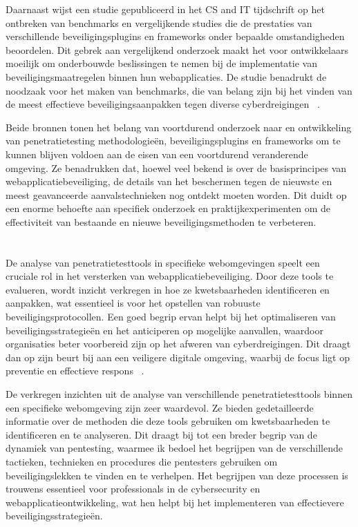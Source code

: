 Daarnaast wijst een studie gepubliceerd in het CS and IT tijdschrift op het ontbreken van benchmarks en vergelijkende studies die de prestaties van verschillende 
beveiligingsplugins en frameworks onder bepaalde omstandigheden beoordelen. Dit gebrek aan vergelijkend onderzoek maakt het voor ontwikkelaars 
moeilijk om onderbouwde beslissingen te nemen bij de implementatie van beveiligingsmaatregelen binnen hun webapplicaties. De studie benadrukt de noodzaak voor 
het maken van benchmarks, die van belang zijn bij het vinden van de meest effectieve beveiligingsaanpakken tegen diverse cyberdreigingen ~\autocite{AbuDabaseh2018}.

Beide bronnen tonen het belang van voortdurend onderzoek naar en ontwikkeling van penetratietesting methodologieën, beveiligingsplugins en frameworks om te kunnen 
blijven voldoen aan de eisen van een voortdurend veranderende omgeving. Ze benadrukken dat, hoewel veel bekend is over de basisprincipes van webapplicatiebeveiliging, 
de details van het beschermen tegen de nieuwste en meest geavanceerde aanvalstechnieken nog ontdekt moeten worden. Dit duidt op een enorme behoefte aan 
specifiek onderzoek en praktijkexperimenten om de effectiviteit van bestaande en nieuwe beveiligingsmethoden te verbeteren.

\section{}
\subsection{}
De analyse van penetratietesttools in specifieke webomgevingen speelt een cruciale rol in het versterken van webapplicatiebeveiliging. Door deze tools 
te evalueren, wordt inzicht verkregen in hoe ze kwetsbaarheden identificeren en aanpakken, wat essentieel is voor het opstellen van robuuste beveiligingsprotocollen. 
Een goed begrip ervan helpt bij het optimaliseren van beveiligingsstrategieën en het anticiperen op mogelijke aanvallen, waardoor organisaties beter voorbereid zijn op het 
afweren van cyberdreigingen. Dit draagt dan op zijn beurt bij aan een veiligere digitale omgeving, waarbij de focus ligt op preventie en effectieve respons
~\autocite{Jarupunphol2023}.

De verkregen inzichten uit de analyse van verschillende penetratietesttools binnen een specifieke webomgeving zijn zeer waardevol. Ze bieden gedetailleerde informatie 
over de methoden die deze tools gebruiken om kwetsbaarheden te identificeren en te analyseren. Dit draagt bij tot een breder begrip van de dynamiek van pentesting, 
waarmee ik bedoel het begrijpen van de verschillende tactieken, technieken en procedures die pentesters gebruiken om beveiligingslekken te vinden en te verhelpen. Het 
begrijpen van deze processen is trouwens essentieel voor professionals in de cybersecurity en webapplicatieontwikkeling, wat hen helpt bij het implementeren van effectievere 
beveiligingsstrategieën.

